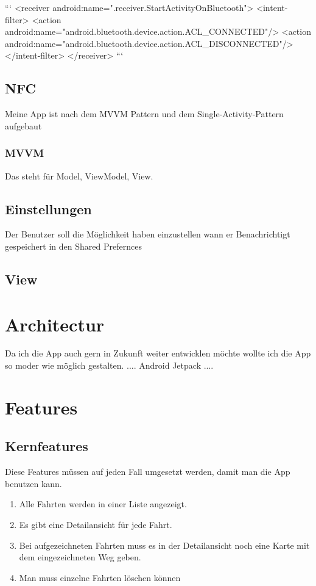 \documentclass[a4paper]{article}
\begin{document}
```
<receiver android:name=".receiver.StartActivityOnBluetooth">
<intent-filter>
	<action android:name="android.bluetooth.device.action.ACL_CONNECTED"/>
	<action android:name="android.bluetooth.device.action.ACL_DISCONNECTED"/>
</intent-filter>
</receiver>
```

\subsection{NFC}
Meine App ist nach dem MVVM Pattern und dem Single-Activity-Pattern aufgebaut

\subsubsection{MVVM}
Das steht für Model, ViewModel, View. 

\subsection{Einstellungen}
Der Benutzer soll die Möglichkeit haben einzustellen wann er Benachrichtigt
gespeichert in den Shared Prefernces

\subsection{View}

\section{Architectur}
Da ich die App auch gern in Zukunft weiter entwicklen möchte wollte ich die App so moder wie möglich gestalten.
....
Android Jetpack
....


\section{Features}

\subsection{Kernfeatures}
Diese Features müssen auf jeden Fall umgesetzt werden, damit man die App benutzen kann. 
\begin{enumerate}
	\item Alle Fahrten werden in einer Liste angezeigt.
	\item Es gibt eine Detailansicht für jede Fahrt.
	\item Bei aufgezeichneten Fahrten muss es in der Detailansicht noch eine Karte mit dem eingezeichneten Weg geben.
	\item Man muss einzelne Fahrten löschen können
\end{enumerate}
\end{document}
